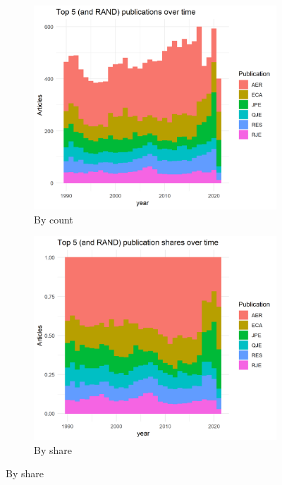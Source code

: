 \documentclass[11pt, letterpaper, twoside]{article}
\begin{document}
\begin{figure}[!ht]
    \begin{subfigure}[h]{0.49\textwidth}
        \centering
        \includegraphics[width=\textwidth]{top_5_over_time_col.png}
        \caption{By count}
    \end{subfigure}
    \hfill
    \begin{subfigure}[h]{0.49\textwidth}
        \centering
        \includegraphics[width=\textwidth]{top_5_over_time_col_shares.png}
        \caption{By share}
    \end{subfigure}

\end{figure}
\end{document}
